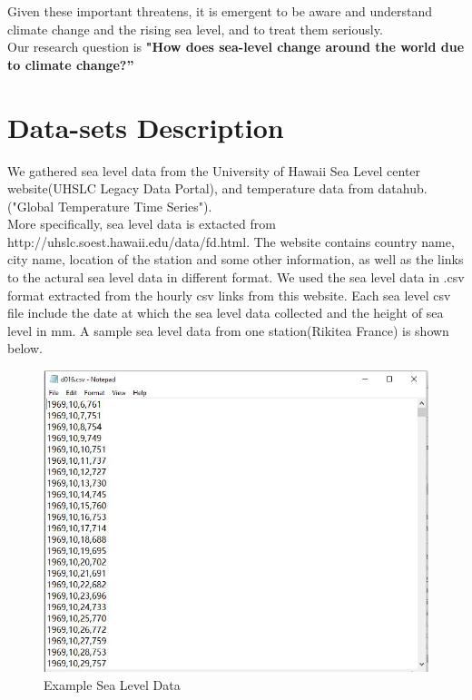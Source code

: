 \documentclass[fontsize=11pt]{article}
\begin{document}
    Given these important threatens, it is emergent to be aware and understand climate change and the rising sea level, and to treat them seriously.\\

    Our research question is \textbf{"How does sea-level change around the world due to climate change?”} 

    \newpage
    \section*{Data-sets Description}
    We gathered sea level data from the University of Hawaii Sea Level center website(UHSLC Legacy Data Portal), and temperature data from datahub. ("Global Temperature Time Series").\\
    More specifically, sea level data is extacted from http://uhslc.soest.hawaii.edu/data/fd.html. The website contains country name, city name, location of the station and some other information, as well as the links to the actural sea level data in different format. We used the sea level data in .csv format extracted from the hourly csv links from this website. Each sea level csv file include the date at which the sea level data collected and the height of sea level in mm. A sample sea level data from one station(Rikitea	France) is shown below. 
    \begin{figure}[h!]
    \centering
    \includegraphics[scale=0.5]{sample_sea_level_data.JPG}
    \caption{Example Sea Level Data}
    \label{fig:sample_sea_level_data.JPG}
    \end{figure}
\end{document}
